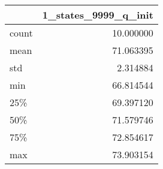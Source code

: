 \begin{tabular}{lr}
\toprule
{} &  1\_states\_9999\_q\_init \\
\midrule
count &             10.000000 \\
mean  &             71.063395 \\
std   &              2.314884 \\
min   &             66.814544 \\
25\%   &             69.397120 \\
50\%   &             71.579746 \\
75\%   &             72.854617 \\
max   &             73.903154 \\
\bottomrule
\end{tabular}
